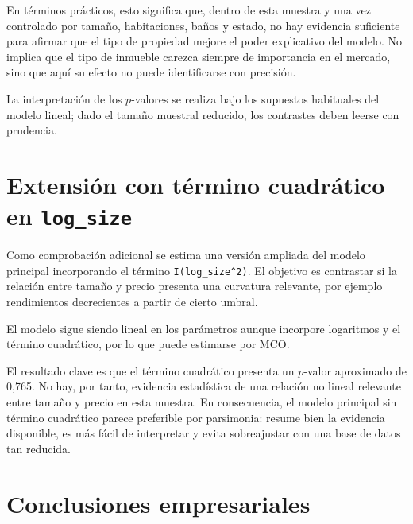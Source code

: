 \documentclass[11pt,a4paper]{article}
\begin{document}
En términos prácticos, esto significa que, dentro de esta muestra y una vez controlado por tamaño, habitaciones, baños y estado, no hay evidencia suficiente para afirmar que el tipo de propiedad mejore el poder explicativo del modelo. No implica que el tipo de inmueble carezca siempre de importancia en el mercado, sino que aquí su efecto no puede identificarse con precisión.

La interpretación de los $p$-valores se realiza bajo los supuestos habituales del modelo lineal; dado el tamaño muestral reducido, los contrastes deben leerse con prudencia.

\section{Extensión con término cuadrático en \texttt{log\_size}}

Como comprobación adicional se estima una versión ampliada del modelo principal incorporando el término \texttt{I(log\_size\textasciicircum2)}. El objetivo es contrastar si la relación entre tamaño y precio presenta una curvatura relevante, por ejemplo rendimientos decrecientes a partir de cierto umbral.

El modelo sigue siendo lineal en los parámetros aunque incorpore logaritmos y el término cuadrático, por lo que puede estimarse por MCO.

El resultado clave es que el término cuadrático presenta un $p$-valor aproximado de 0,765. No hay, por tanto, evidencia estadística de una relación no lineal relevante entre tamaño y precio en esta muestra. En consecuencia, el modelo principal sin término cuadrático parece preferible por parsimonia: resume bien la evidencia disponible, es más fácil de interpretar y evita sobreajustar con una base de datos tan reducida.

\section{Conclusiones empresariales}
\end{document}
